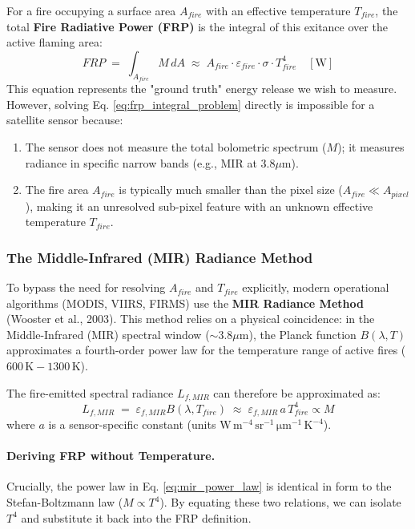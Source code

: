 For a fire occupying a surface area $A_{fire}$ with an effective temperature $T_{fire}$, the total \textbf{Fire Radiative Power (FRP)} is the integral of this exitance over the active flaming area:
\begin{equation}
    FRP \;=\; \int_{A_{fire}} M \, dA \;\approx\; A_{fire} \cdot \varepsilon_{fire} \cdot \sigma \cdot T_{fire}^4 \quad [\mathrm{W}]
    \label{eq:frp_integral_problem}
\end{equation}
This equation represents the "ground truth" energy release we wish to measure. However, solving Eq. \ref{eq:frp_integral_problem} directly is impossible for a satellite sensor because:
\begin{enumerate}
    \item The sensor does not measure the total bolometric spectrum ($M$); it measures radiance in specific narrow bands (e.g., MIR at $3.8\mu$m).
    \item The fire area $A_{fire}$ is typically much smaller than the pixel size ($A_{fire} \ll A_{pixel}$), making it an unresolved sub-pixel feature with an unknown effective temperature $T_{fire}$.
\end{enumerate}

\subsubsection{The Middle-Infrared (MIR) Radiance Method}
To bypass the need for resolving $A_{fire}$ and $T_{fire}$ explicitly, modern operational algorithms (MODIS, VIIRS, FIRMS) use the \textbf{MIR Radiance Method} (Wooster et al., 2003)\cite{wooster_fire_2003}. This method relies on a physical coincidence: in the Middle-Infrared (MIR) spectral window ($\sim 3.8 \mu$m), the Planck function $B(\lambda, T)$ approximates a fourth-order power law for the temperature range of active fires ($600\,\mathrm{K} - 1300\,\mathrm{K}$).

The fire-emitted spectral radiance $L_{f,MIR}$ can therefore be approximated as:
\begin{equation}
    L_{f,MIR} \;=\; \varepsilon_{f,MIR} B(\lambda, T_{fire}) \;\approx\; \varepsilon_{f,MIR}\, a \, T_{fire}^4 \propto M
    \label{eq:mir_power_law}
\end{equation}
where $a$ is a sensor-specific constant (units $\mathrm{W\,m^{-4}\,sr^{-1}\,\mu m^{-1}\,K^{-4}}$).

\paragraph{Deriving FRP without Temperature.}
Crucially, the power law in Eq. \ref{eq:mir_power_law} is identical in form to the Stefan-Boltzmann law ($M \propto T^4$). By equating these two relations, we can isolate $T^4$ and substitute it back into the FRP definition.


